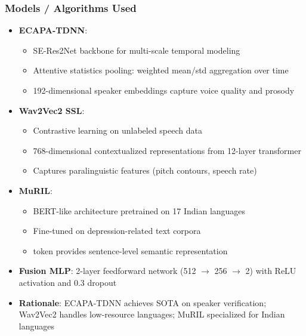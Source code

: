 \documentclass{beamer}
\begin{document}
\begin{frame}
\frametitle{Models / Algorithms Used}
\begin{itemize}
    \item \textbf{ECAPA-TDNN}:
    \begin{itemize}
        \item SE-Res2Net backbone for multi-scale temporal modeling
        \item Attentive statistics pooling: weighted mean/std aggregation over time
        \item 192-dimensional speaker embeddings capture voice quality and prosody
    \end{itemize}
    \item \textbf{Wav2Vec2 SSL}:
    \begin{itemize}
        \item Contrastive learning on unlabeled speech data
        \item 768-dimensional contextualized representations from 12-layer transformer
        \item Captures paralinguistic features (pitch contours, speech rate)
    \end{itemize}
    \item \textbf{MuRIL}:
    \begin{itemize}
        \item BERT-like architecture pretrained on 17 Indian languages
        \item Fine-tuned on depression-related text corpora
        \item [CLS] token provides sentence-level semantic representation
    \end{itemize}
    \item \textbf{Fusion MLP}: 2-layer feedforward network (512 $\rightarrow$ 256 $\rightarrow$ 2) with ReLU activation and 0.3 dropout
    \item \textbf{Rationale}: ECAPA-TDNN achieves SOTA on speaker verification; Wav2Vec2 handles low-resource languages; MuRIL specialized for Indian languages
\end{itemize}
\end{frame}
\end{document}

